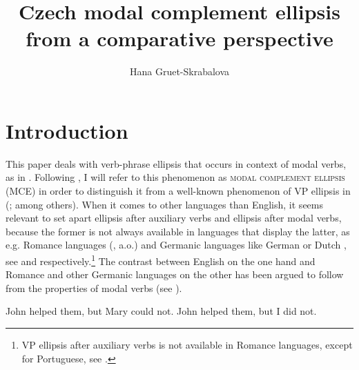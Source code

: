 \documentclass[output=paper,colorlinks,citecolor=brown,
modfonts
]{langscibook}
\title{Czech modal complement ellipsis from a comparative perspective}
\author{
 Hana Gruet-Skrabalova\affiliation{Université Clermont Auvergne, \\Laboratoire de recherche sur le langage}
}
\begin{document}
\maketitle

\section{Introduction} \label{sec:1}
This paper deals with verb-phrase ellipsis that occurs in context of modal verbs, as in . Following \cite{Aelbrecht2008}, I will refer to this phenomenon as \textsc{modal complement ellipsis} (MCE) in order to distinguish it from a well-known phenomenon of VP ellipsis in  (\citealt{Ross1969,Sag1976,Merchant2001}; among others). When it comes to other languages than English, it seems relevant to set apart ellipsis after auxiliary verbs and ellipsis after modal verbs, because the former is not always available in languages that display the latter, as e.g. Romance languages (\citealt{busquets2001ellipse,Depiante2001,Dagnac2008,Dagnac2010}, a.o.) and Germanic languages like German or Dutch \citep{Lobeck1995,Aelbrecht2008}, see  and  respectively.\footnote{VP ellipsis after auxiliary verbs is not available in Romance languages, except for Portuguese, see \cite{Cyrino-Matos2002}.} The contrast between English on the one hand and Romance and other Germanic languages on the other has been argued to follow from the properties of modal verbs (see  ).

\begin{exe}
\ex \label{english}
\begin{xlist}
\ex\label{1a} John helped them, but Mary could not.
\ex \label{1b}John helped them, but I did not.
\end{xlist}	

\ex	
\begin{xlist}\label{2}
\end{xlist}

\ex	
\begin{xlist}\label{3}
\end{xlist}
\end{exe} 
\end{document}
